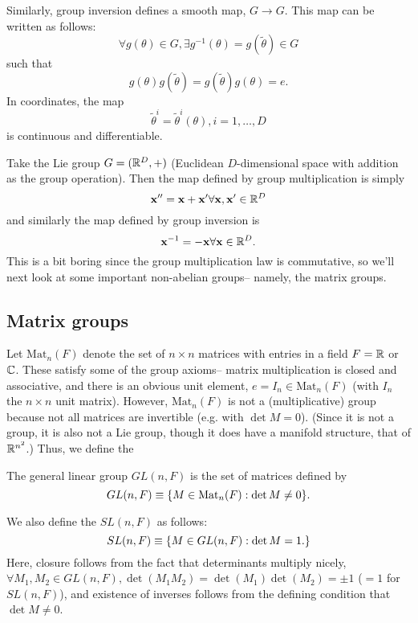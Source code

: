 Similarly, group inversion defines a smooth map, $G\to G$. This map can be written as follows:
$$\forall g(\theta)\in G, \exists g^{-1}(\theta)=g(\tilde \theta)\in G$$
such that $$g(\theta)g(\tilde\theta)=g(\tilde\theta)g(\theta)=e.$$
In coordinates, the map
$$\tilde \theta^i = \tilde\theta^i(\theta), i =1,\ldots, D$$
is continuous and differentiable.

\begin{exm}
Take the Lie group $G=(\mathbb{R}^D,+)$ (Euclidean $D$-dimensional space with addition as the group operation). Then the map defined by group multiplication is simply
$$\boldsymbol{\mathbf{x}}''=\boldsymbol{\mathbf{x}}+\boldsymbol{\mathbf{x}}' \forall \boldsymbol{\mathbf{x}},\boldsymbol{\mathbf{x}}'\in \mathbb{R}^D$$
and similarly the map defined by group inversion is
$$\boldsymbol{\mathbf{x}}^{-1}=-\boldsymbol{\mathbf{x}} \forall \boldsymbol{\mathbf{x}}\in \mathbb{R}^D.$$
This is a bit boring since the group multiplication law is commutative, so we'll next look at some important non-abelian groups-- namely, the matrix groups.
\end{exm}

\subsection*{Matrix groups} Let $\text{Mat}_n(F)$ denote the set of $n\times n$ matrices with entries in a field $F=\mathbb{R}$ or $\mathbb{C}$. These satisfy some of the group axioms-- matrix multiplication is closed and associative, and there is an obvious unit element, $e=I_n \in \text{Mat}_n(F)$ (with $I_n$ the $n\times n$ unit matrix). However, $\text{Mat}_n(F)$ is not a (multiplicative) group because not all matrices are invertible (e.g. with $\det M=0$). (Since it is not a group, it is also not a Lie group, though it does have a manifold structure, that of $\mathbb{R}^{n^2}$.) Thus, we define the 
\begin{defn}
The general linear group $GL(n,F)$ is the set of matrices defined by
\begin{equation}
GL(n,F)\equiv \{M\in \text{Mat}_n(F): \det M \neq 0\}.
\end{equation}
\end{defn}

\begin{defn}
We also define the  $SL(n,F)$ as follows:
\begin{equation}
SL(n,F)\equiv \{M\in GL(n,F): \det M = 1.\}
\end{equation}
Here, closure follows from the fact that determinants multiply nicely, $\forall M_1,M_2\in GL(n,F),\det(M_1M_2)=\det(M_1)\det(M_2)=\pm 1$ ($=1$ for $SL(n,F)$), and existence of inverses follows from the defining condition that $\det M\neq 0$.
\end{defn}

